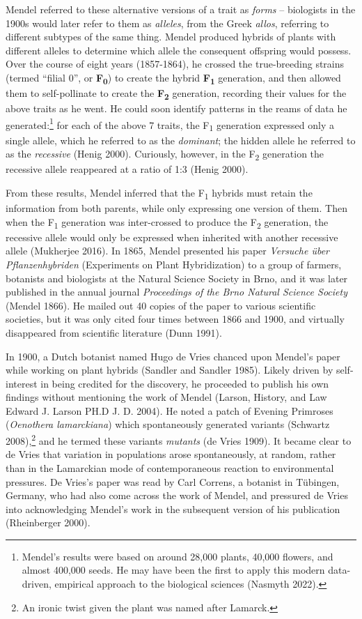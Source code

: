 \documentclass[
]{book}
\begin{document}
Mendel referred to these alternative versions of a trait as \emph{forms} -- biologists in the 1900s would later refer to them as \emph{alleles}, from the Greek \emph{allos}, referring to different subtypes of the same thing. Mendel produced hybrids of plants with different alleles to determine which allele the consequent offspring would possess. Over the course of eight years (1857-1864), he crossed the true-breeding strains (termed ``filial 0'', or \textbf{F\textsubscript{0}}) to create the hybrid \textbf{F\textsubscript{1}} generation, and then allowed them to self-pollinate to create the \textbf{F\textsubscript{2}} generation, recording their values for the above traits as he went. He could soon identify patterns in the reams of data he generated:\footnote{Mendel's results were based on around 28,000 plants, 40,000 flowers, and almost 400,000 seeds. He may have been the first to apply this modern data-driven, empirical approach to the biological sciences (Nasmyth 2022).} for each of the above 7 traits, the F\textsubscript{1} generation expressed only a single allele, which he referred to as the \emph{dominant}; the hidden allele he referred to as the \emph{recessive} (Henig 2000). Curiously, however, in the F\textsubscript{2} generation the recessive allele reappeared at a ratio of 1:3 (Henig 2000).

From these results, Mendel inferred that the F\textsubscript{1} hybrids must retain the information from both parents, while only expressing one version of them. Then when the F\textsubscript{1} generation was inter-crossed to produce the F\textsubscript{2} generation, the recessive allele would only be expressed when inherited with another recessive allele (Mukherjee 2016). In 1865, Mendel presented his paper \emph{Versuche über Pflanzenhybriden} (Experiments on Plant Hybridization) to a group of farmers, botanists and biologists at the Natural Science Society in Brno, and it was later published in the annual journal \emph{Proceedings of the Brno Natural Science Society} (Mendel 1866). He mailed out 40 copies of the paper to various scientific societies, but it was only cited four times between 1866 and 1900, and virtually disappeared from scientific literature (Dunn 1991).

In 1900, a Dutch botanist named Hugo de Vries chanced upon Mendel's paper while working on plant hybrids (Sandler and Sandler 1985). Likely driven by self-interest in being credited for the discovery, he proceeded to publish his own findings without mentioning the work of Mendel (Larson, History, and Law Edward J. Larson PH.D J. D. 2004). He noted a patch of Evening Primroses (\emph{Oenothera lamarckiana}) which spontaneously generated variants (Schwartz 2008),\footnote{An ironic twist given the plant was named after Lamarck.} and he termed these variants \emph{mutants} (de Vries 1909). It became clear to de Vries that variation in populations arose spontaneously, at random, rather than in the Lamarckian mode of contemporaneous reaction to environmental pressures. De Vries's paper was read by Carl Correns, a botanist in Tübingen, Germany, who had also come across the work of Mendel, and pressured de Vries into acknowledging Mendel's work in the subsequent version of his publication (Rheinberger 2000).
\end{document}
